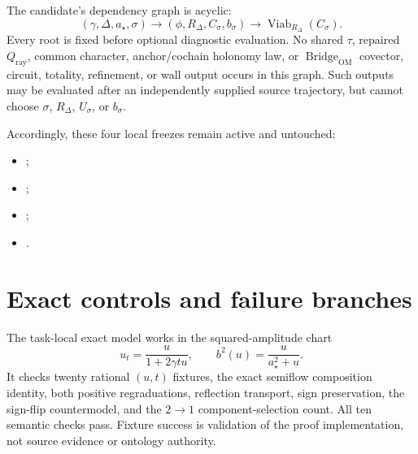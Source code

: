 \documentclass[11pt]{article}
\newcommand{\Us}{U_{\sigma}}
\newcommand{\bs}{b_{\sigma}}
\newcommand{\Viab}{\operatorname{Viab}}
\begin{document}
The candidate's dependency graph is acyclic:
\[
 (\gamma,\Delta,a_\star,\sigma)
 \longrightarrow (\phi,R_\Delta,C_\sigma,b_\sigma)
 \longrightarrow \Viab_{R_\Delta}(C_\sigma).
\]
Every root is fixed before optional diagnostic evaluation.  No shared
$\tau$, repaired $Q_{\mathrm{ray}}$, common character, anchor/cochain
holonomy law, or $\operatorname{Bridge}_{\mathrm{OM}}$ covector, circuit,
totality, refinement, or wall output occurs in this graph.  Such outputs may
be evaluated after an independently supplied source trajectory, but cannot
choose $\sigma$, $R_\Delta$, $\Us$, or $\bs$.

Accordingly, these four local freezes remain active and untouched:
\begin{itemize}
 \item {};
 \item {};
 \item {};
 \item {}.
\end{itemize}

\section{Exact controls and failure branches}

The task-local exact model works in the squared-amplitude chart
\[
 u_t=\frac{u}{1+2\gamma tu},\qquad
 b^2(u)=\frac{u}{a_\star^2+u}.
\]
It checks twenty rational $(u,t)$ fixtures, the exact semiflow composition
identity, both positive regraduations, reflection transport, sign
preservation, the sign-flip countermodel, and the $2\to1$ component-selection
count.  All ten semantic checks pass.  Fixture success is validation of the
proof implementation, not source evidence or ontology authority.
\end{document}
